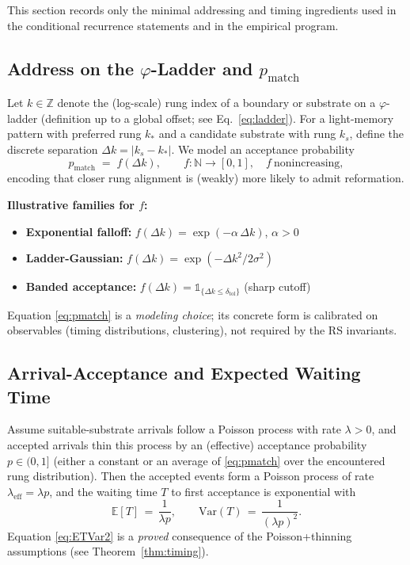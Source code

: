 \documentclass[11pt,letterpaper]{article}
\theoremstyle{definition}
\theoremstyle{remark}
\begin{document}
This section records only the minimal addressing and timing ingredients used in the conditional recurrence statements and in the empirical program.

\subsection{Address on the \texorpdfstring{\(\varphi\)}{φ}-Ladder and \texorpdfstring{\(p_{\mathrm{match}}\)}{p\_match}}

Let \(k\in\mathbb{Z}\) denote the (log-scale) rung index of a boundary or substrate on a \(\varphi\)-ladder (definition up to a global offset; see Eq.~\ref{eq:ladder}). For a light-memory pattern with preferred rung \(k_{\!*}\) and a candidate substrate with rung \(k_s\), define the discrete separation \(\Delta k=|k_s-k_{\!*}|\). We model an acceptance probability
\begin{equation}
  p_{\mathrm{match}} \;=\; f(\Delta k),\qquad f\!:\!\mathbb{N}\to[0,1],\quad f\ \text{nonincreasing}, \label{eq:pmatch}
\end{equation}
encoding that closer rung alignment is (weakly) more likely to admit reformation. 

\textbf{Illustrative families for \(f\):}
\begin{itemize}
  \item \textbf{Exponential falloff:} \(f(\Delta k)=\exp(-\alpha\,\Delta k)\), \(\alpha>0\)
  \item \textbf{Ladder-Gaussian:} \(f(\Delta k)=\exp(-\Delta k^{2}/2\sigma^{2})\)
  \item \textbf{Banded acceptance:} \(f(\Delta k)=\mathbb{1}_{\{\Delta k\le \delta_{\text{tol}}\}}\) (sharp cutoff)
\end{itemize}

Equation \eqref{eq:pmatch} is a \emph{modeling choice}; its concrete form is calibrated on observables (timing distributions, clustering), not required by the RS invariants.

\subsection{Arrival-Acceptance and Expected Waiting Time}

Assume suitable-substrate arrivals follow a Poisson process with rate \(\lambda>0\), and accepted arrivals thin this process by an (effective) acceptance probability \(p\in(0,1]\) (either a constant or an average of \eqref{eq:pmatch} over the encountered rung distribution). Then the accepted events form a Poisson process of rate \(\lambda_{\mathrm{eff}}=\lambda p\), and the waiting time \(T\) to first acceptance is exponential with
\begin{equation}
  \mathbb{E}[T] \,=\, \frac{1}{\lambda p},\qquad \mathrm{Var}(T) \,=\, \frac{1}{(\lambda p)^2}. \label{eq:ETVar2}
\end{equation}
Equation \eqref{eq:ETVar2} is a \emph{proved} consequence of the Poisson+thinning assumptions (see Theorem~\ref{thm:timing}).
\end{document}
